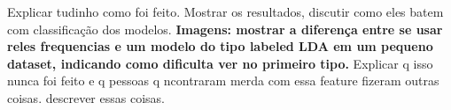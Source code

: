Explicar tudinho como foi feito. Mostrar os resultados, discutir como eles batem com classificação dos modelos.
\textbf{Imagens: mostrar a diferença entre se usar reles frequencias e um modelo do tipo labeled LDA em um pequeno dataset, indicando como dificulta ver no primeiro tipo.} 
Explicar q isso nunca foi feito e q pessoas q ncontraram merda com essa feature fizeram outras coisas. descrever essas coisas.






